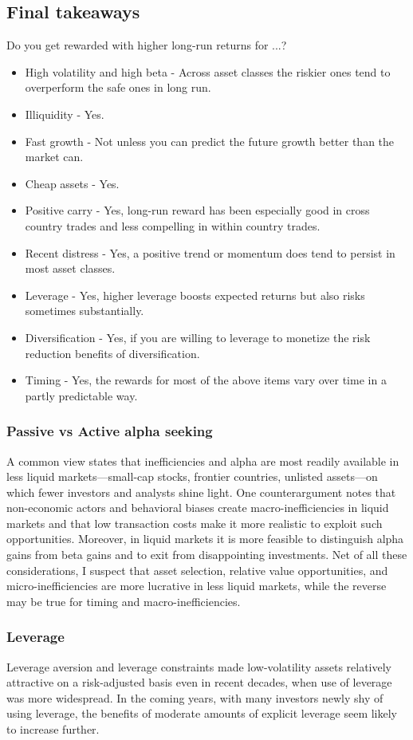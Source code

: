 \documentclass[12 pt]{article}
\begin{document}
\subsection{Final takeaways}
Do you get rewarded with higher long-run returns for ...?
\begin{itemize}
\item High volatility and high beta - Across asset classes the riskier ones tend to overperform the safe ones in long run. 
\item Illiquidity -  Yes. 
\item Fast growth - Not unless you can 	predict the future growth better than the market can. 
\item Cheap assets - Yes. 
\item Positive carry - Yes, long-run reward has been especially good in cross country trades and less compelling in within country trades. 
\item Recent distress - Yes, a positive trend or momentum does tend to persist in most asset classes. 
\item Leverage - Yes, higher leverage boosts expected returns but also risks sometimes substantially. 
\item Diversification - Yes, if you are willing to leverage to monetize the risk reduction benefits of diversification. 
\item Timing - Yes, the rewards for most of the above items vary over time in a partly predictable way. 
\end{itemize}
\subsubsection{Passive vs Active alpha seeking}
A common view states that inefficiencies and alpha are most readily available in less liquid markets—small-cap stocks, frontier countries,
unlisted assets—on which fewer investors and analysts shine light. One counterargument notes that non-economic actors and behavioral biases
create macro-inefficiencies in liquid markets and that low transaction costs make it more realistic to exploit such opportunities. Moreover, in liquid markets it is more feasible to distinguish alpha gains from beta gains and to exit from disappointing investments. Net of all these considerations, I suspect that asset selection, relative value opportunities, and micro-inefficiencies are more lucrative in less liquid markets, while the reverse may be true for timing and macro-inefficiencies.
\subsubsection{Leverage}
Leverage aversion and leverage constraints made low-volatility assets relatively attractive on a risk-adjusted basis even in recent decades, when use of leverage was more widespread. In the coming years, with many investors newly shy of using leverage, the benefits of moderate amounts of explicit leverage seem likely to increase further.
\end{document}
